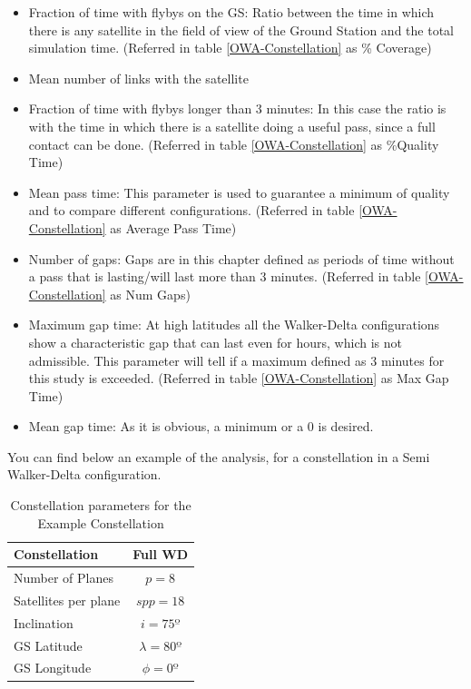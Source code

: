 \begin{itemize}
\item Fraction of time with flybys on the GS: Ratio between the time in which there is any satellite in the field of view of the Ground Station and the total simulation time. (Referred in table \ref{OWA-Constellation} as \% Coverage)
\item Mean number of links with the satellite
\item Fraction of time with flybys longer than 3 minutes: In this case the ratio is with the time in which there is a satellite doing a useful pass, since a full contact can be done. (Referred in table \ref{OWA-Constellation} as \%Quality Time) 
\item Mean pass time: This parameter is used to guarantee a minimum of quality and to compare different configurations. (Referred in table \ref{OWA-Constellation} as Average Pass Time)
\item Number of gaps: Gaps are in this chapter defined as periods of time without a pass that is lasting/will last more than 3 minutes. (Referred in table \ref{OWA-Constellation} as Num Gaps)
\item Maximum gap time: At high latitudes all the Walker-Delta configurations show a characteristic gap that can last even for hours, which is not admissible. This parameter will tell if a maximum defined as 3 minutes for this study is exceeded. (Referred in table \ref{OWA-Constellation} as Max Gap Time)
\item Mean gap time: As it is obvious, a minimum or a 0 is desired. 
\end{itemize}

You can find below an example of the analysis, for a constellation in a Semi Walker-Delta configuration.

\begin{table}[H]
\centering
\begin{tabular}{|l|c|}
\hline
Constellation & Full WD \\ \hline
Number of Planes     & $ p=8 $   \\ \hline
Satellites per plane   & $ spp=18 $ \\ \hline
Inclination  	 & $ i=75º $   \\ \hline
GS Latitude   & $ \lambda=80º$   \\ \hline
GS Longitude & $ \phi=0º $ \\ \hline
\end{tabular}
\caption{Constellation parameters for the Example Constellation}
\end{table}

